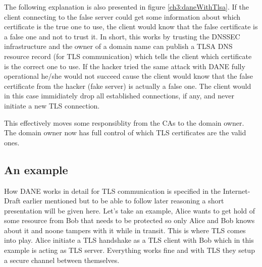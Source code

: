 The following explanation is also presented in figure \ref{ch3:daneWithTlsa}.
If the client connecting to the false server could get some information about which certificate is the true one to use, the client would know that the false certificate is a false one and not to trust it.
In short, this works by trusting the DNSSEC infrastructure and the owner of a domain name can publish a TLSA DNS resource record (for TLS communication) which tells the client which certificate is the correct one to use.
If the hacker tried the same attack with DANE fully operational he/she would not succeed cause the client would know that the false certificate from the hacker (fake server) is actually a false one.
The client would in this case immidiately drop all established connections, if any, and never initiate a new TLS connection.

This effectively moves some responsiblity from the CAs to the domain owner.
The domain owner now has full control of which TLS certificates are the valid ones.

\subsection{An example}
How DANE works in detail for TLS communication is specified in the Internet-Draft earlier mentioned\cite{rfc:draft-dane} but to be able to follow later reasoning a short presentation will be given here.
Let's take an example, Alice wants to get hold of some resource from Bob that needs to be protected so only Alice and Bob knows about it and noone tampers with it while in transit.
This is where TLS comes into play.
Alice initiate a TLS handshake as a TLS client with Bob which in this example is acting as TLS server. 
Everything works fine and with TLS they setup a secure channel between themselves.

